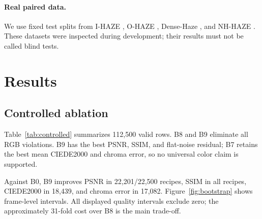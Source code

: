 \documentclass[10pt,twocolumn]{article}
\begin{document}
\paragraph{Real paired data.}
We use fixed test splits from I-HAZE \cite{ancuti2018ihaze}, O-HAZE \cite{ancuti2018ohaze},
Dense-Haze \cite{ancuti2019dense}, and NH-HAZE \cite{ancuti2020nh}. These datasets were inspected
during development; their results must not be called blind tests.

\section{Results}
\subsection{Controlled ablation}
Table~\ref{tab:controlled} summarizes 112,500 valid rows. B8 and B9 eliminate all RGB violations.
B9 has the best PSNR, SSIM, and flat-noise residual; B7 retains the best mean CIEDE2000 and chroma
error, so no universal color claim is supported.

\begin{table}[t]
\centering
\caption{DIODE controlled means over 22,500 recipes.}
\label{tab:controlled}
\end{table}

Against B0, B9 improves PSNR in 22,201/22,500 recipes, SSIM in all recipes, CIEDE2000 in 18,439,
and chroma error in 17,082. Figure~\ref{fig:bootstrap} shows frame-level intervals. All displayed
quality intervals exclude zero; the approximately 31-fold cost over B8 is the main trade-off.
\end{document}
